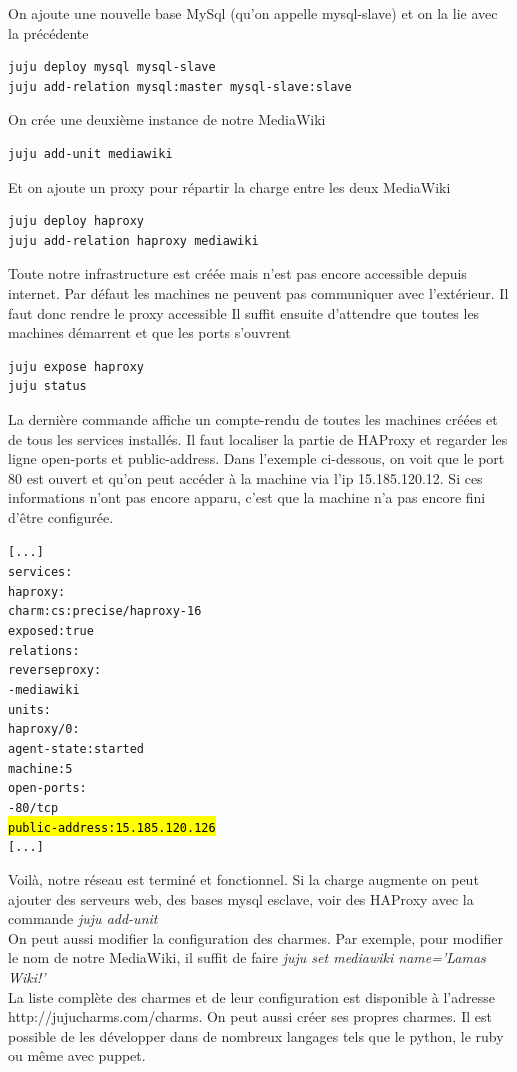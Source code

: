 \documentclass[a4paper,oneside]{report}
\begin{document}
On ajoute une nouvelle base MySql (qu'on appelle mysql-slave) et on la lie avec la précédente
\begin{verbatim}
juju deploy mysql mysql-slave
juju add-relation mysql:master mysql-slave:slave
\end{verbatim}

On crée une deuxième instance de notre MediaWiki
\begin{verbatim}
juju add-unit mediawiki
\end{verbatim}


Et on ajoute un proxy pour répartir la charge entre les deux MediaWiki
\begin{verbatim}
juju deploy haproxy
juju add-relation haproxy mediawiki
\end{verbatim}

Toute notre infrastructure est créée mais n'est pas encore accessible depuis internet. 
Par défaut les machines ne peuvent pas communiquer avec l'extérieur. Il faut donc rendre le proxy accessible
Il suffit ensuite d'attendre que toutes les machines démarrent et que les ports s'ouvrent
\begin{verbatim}
juju expose haproxy
juju status
\end{verbatim}

La dernière commande affiche un compte-rendu de toutes les machines créées et de tous les services installés. Il faut localiser la partie de HAProxy et regarder les ligne open-ports et public-address. Dans l'exemple ci-dessous, on voit que le port 80 est ouvert et qu'on peut accéder à la machine via l'ip 15.185.120.12. Si ces informations n'ont pas encore apparu, c'est que la machine n'a pas encore fini d'être configurée. 
\begin{alltt}
[...]
services:
  haproxy:
    charm: cs:precise/haproxy-16
    exposed: true
    relations:
      reverseproxy:
      - mediawiki
    units:
      haproxy/0:
        agent-state: started
        machine: 5
        open-ports:
        - 80/tcp
        \hl{public-address: 15.185.120.126}
[...]
\end{alltt}

Voilà, notre réseau est terminé et fonctionnel. Si la charge augmente on peut ajouter des serveurs web, des bases mysql esclave, voir des HAProxy avec la commande \emph{juju add-unit}\\
On peut aussi modifier la configuration des charmes. Par exemple, pour modifier le nom de notre MediaWiki, il suffit de faire \emph{juju set mediawiki name='Lamas Wiki!'}\\
La liste complète des charmes et de leur configuration est disponible à l'adresse http://jujucharms.com/charms.
On peut aussi créer ses propres charmes. Il est possible de les développer dans de nombreux langages tels que le python, le ruby ou même avec puppet.
\newpage
\end{document}
